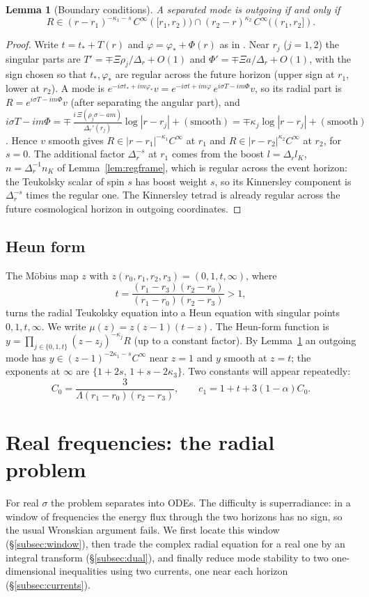 \documentclass[11pt]{amsart}
\newtheorem{lemma}[theorem]{Lemma}
\theoremstyle{definition}
\theoremstyle{remark}
\numberwithin{equation}{section}
\begin{document}
\begin{lemma}[Boundary conditions]\label{lem:bc}
A separated mode is outgoing if and only if
\[
R\in(r-r_1)^{-\kappa_1-s}\,C^\infty([r_1,r_2))\cap(r_2-r)^{\kappa_2}\,C^\infty((r_1,r_2]).
\]
\end{lemma}
\begin{proof}
Write $t=t_*+T(r)$ and $\varphi=\varphi_*+\Phi(r)$ as in \cite[(3.4)]{Hin26}. Near $r_j$ ($j=1,2$) the singular parts are
$T'=\mp\Xi\rho_j/\Delta_r+O(1)$ and $\Phi'=\mp\Xi a/\Delta_r+O(1)$, with the sign chosen so that $t_*,\varphi_*$ are regular
across the future horizon (upper sign at $r_1$, lower at $r_2$). A mode is
$e^{-i\sigma t_*+im\varphi_*}v=e^{-i\sigma t+im\varphi}\,e^{i\sigma T-im\Phi}v$, so its radial part is
$R=e^{i\sigma T-im\Phi}v$ (after separating the angular part), and
$i\sigma T-im\Phi=\mp\,\frac{i\,\Xi(\rho_j\sigma-am)}{\Delta_r'(r_j)}\log|r-r_j|+(\text{smooth})=\mp\kappa_j\log|r-r_j|+(\text{smooth})$.
Hence $v$ smooth gives $R\in|r-r_1|^{-\kappa_1}C^\infty$ at $r_1$ and $R\in|r-r_2|^{\kappa_2}C^\infty$ at $r_2$, for $s=0$. The additional factor $\Delta_r^{-s}$ at $r_1$ comes from the boost
$l=\Delta_rl_K$, $n=\Delta_r^{-1}n_K$ of Lemma~\ref{lem:regframe}, which is regular across the event horizon: the Teukolsky
scalar of spin $s$ has boost weight $s$, so its Kinnersley component is $\Delta_r^{-s}$ times the regular one. The Kinnersley tetrad is
already regular across the future cosmological horizon in outgoing coordinates.
\end{proof}

\subsection{Heun form}
The M\"obius map $z$ with $z(r_0,r_1,r_2,r_3)=(0,1,t,\infty)$, where
\[
t=\frac{(r_1-r_3)(r_2-r_0)}{(r_1-r_0)(r_2-r_3)}>1,
\]
turns the radial Teukolsky equation into a Heun equation with singular points $0,1,t,\infty$. We write
$\mu(z)=z(z-1)(t-z)$. The Heun-form function is $y=\prod_{j\in\{0,1,t\}}(z-z_j)^{-\kappa_j}R$ (up to a constant factor).
By Lemma~\ref{lem:bc} an outgoing mode has $y\in(z-1)^{-2\kappa_1-s}C^\infty$ near $z=1$ and $y$ smooth at $z=t$; the
exponents at $\infty$ are $\{1+2s,\,1+s-2\kappa_3\}$. Two constants will appear repeatedly:
\begin{equation}\label{eq:C0}
C_0=\frac{3}{\Lambda(r_1-r_0)(r_2-r_3)},\qquad c_1=1+t+3(1-\alpha)C_0.
\end{equation}

\section{Real frequencies: the radial problem}\label{sec:radial}
For real $\sigma$ the problem separates into ODEs. The difficulty is superradiance: in a window of frequencies the
energy flux through the two horizons has no sign, so the usual Wronskian argument fails. We first locate this
window (\S\ref{subsec:window}), then trade the complex radial equation for a real one by an integral transform
(\S\ref{subsec:dual}), and finally reduce mode stability to two one-dimensional inequalities using two currents,
one near each horizon (\S\ref{subsec:currents}).
\end{document}
